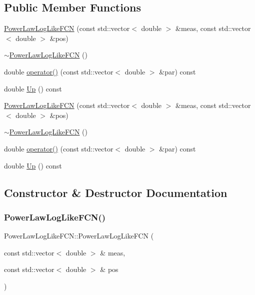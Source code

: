 \subsection*{Public Member Functions}
\begin{DoxyCompactItemize}
\item 
\mbox{\hyperlink{classPowerLawLogLikeFCN_a160035ab7ca7016fe4e034f1cfeef32d}{Power\+Law\+Log\+Like\+F\+CN}} (const std\+::vector$<$ double $>$ \&meas, const std\+::vector$<$ double $>$ \&pos)
\item 
\mbox{\hyperlink{classPowerLawLogLikeFCN_a70fc16a153fdc6b163079c34060b317c}{$\sim$\+Power\+Law\+Log\+Like\+F\+CN}} ()
\item 
double \mbox{\hyperlink{classPowerLawLogLikeFCN_a279b7010b6b252d0772e5d561f749386}{operator()}} (const std\+::vector$<$ double $>$ \&par) const
\item 
double \mbox{\hyperlink{classPowerLawLogLikeFCN_ae1700e7288ed461d0e3354a2f2c5ea6a}{Up}} () const
\item 
\mbox{\hyperlink{classPowerLawLogLikeFCN_a160035ab7ca7016fe4e034f1cfeef32d}{Power\+Law\+Log\+Like\+F\+CN}} (const std\+::vector$<$ double $>$ \&meas, const std\+::vector$<$ double $>$ \&pos)
\item 
\mbox{\hyperlink{classPowerLawLogLikeFCN_a70fc16a153fdc6b163079c34060b317c}{$\sim$\+Power\+Law\+Log\+Like\+F\+CN}} ()
\item 
double \mbox{\hyperlink{classPowerLawLogLikeFCN_a279b7010b6b252d0772e5d561f749386}{operator()}} (const std\+::vector$<$ double $>$ \&par) const
\item 
double \mbox{\hyperlink{classPowerLawLogLikeFCN_ae1700e7288ed461d0e3354a2f2c5ea6a}{Up}} () const
\end{DoxyCompactItemize}


\subsection{Constructor \& Destructor Documentation}
\mbox{\label{classPowerLawLogLikeFCN_a160035ab7ca7016fe4e034f1cfeef32d}} 
\subsubsection{\texorpdfstring{PowerLawLogLikeFCN()}{PowerLawLogLikeFCN()}\hspace{0.1cm}{\footnotesize\ttfamily [1/2]}}
{\footnotesize\ttfamily Power\+Law\+Log\+Like\+F\+C\+N\+::\+Power\+Law\+Log\+Like\+F\+CN (\begin{DoxyParamCaption}\item[{const std\+::vector$<$ double $>$ \&}]{meas,  }\item[{const std\+::vector$<$ double $>$ \&}]{pos }\end{DoxyParamCaption})\hspace{0.3cm}{\ttfamily [inline]}}

